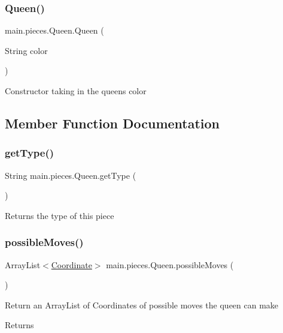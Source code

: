 \subsubsection{\texorpdfstring{Queen()}{Queen()}}
{\footnotesize\ttfamily main.\+pieces.\+Queen.\+Queen (\begin{DoxyParamCaption}\item[{String}]{color }\end{DoxyParamCaption})}

Constructor taking in the queen\textquotesingle{}s color 

\subsection{Member Function Documentation}
\hypertarget{classmain_1_1pieces_1_1_queen_a7964928ca1ea3ecfaa04d80dc5764d5b}{}\label{classmain_1_1pieces_1_1_queen_a7964928ca1ea3ecfaa04d80dc5764d5b} 
\subsubsection{\texorpdfstring{get\+Type()}{getType()}}
{\footnotesize\ttfamily String main.\+pieces.\+Queen.\+get\+Type (\begin{DoxyParamCaption}{ }\end{DoxyParamCaption})}

Returns the type of this piece \hypertarget{classmain_1_1pieces_1_1_queen_a8791ac2f814bb5d3791c7787e2714b9e}{}\label{classmain_1_1pieces_1_1_queen_a8791ac2f814bb5d3791c7787e2714b9e} 
\subsubsection{\texorpdfstring{possible\+Moves()}{possibleMoves()}}
{\footnotesize\ttfamily Array\+List$<$\hyperlink{classmain_1_1model_1_1_coordinate}{Coordinate}$>$ main.\+pieces.\+Queen.\+possible\+Moves (\begin{DoxyParamCaption}{ }\end{DoxyParamCaption})}

Return an Array\+List of Coordinates of possible moves the queen can make \begin{DoxyReturn}{Returns}

\end{DoxyReturn}
\hypertarget{classmain_1_1pieces_1_1_queen_a87b715eb4a56c840d1e1830264d23a56}{}\label{classmain_1_1pieces_1_1_queen_a87b715eb4a56c840d1e1830264d23a56} 
